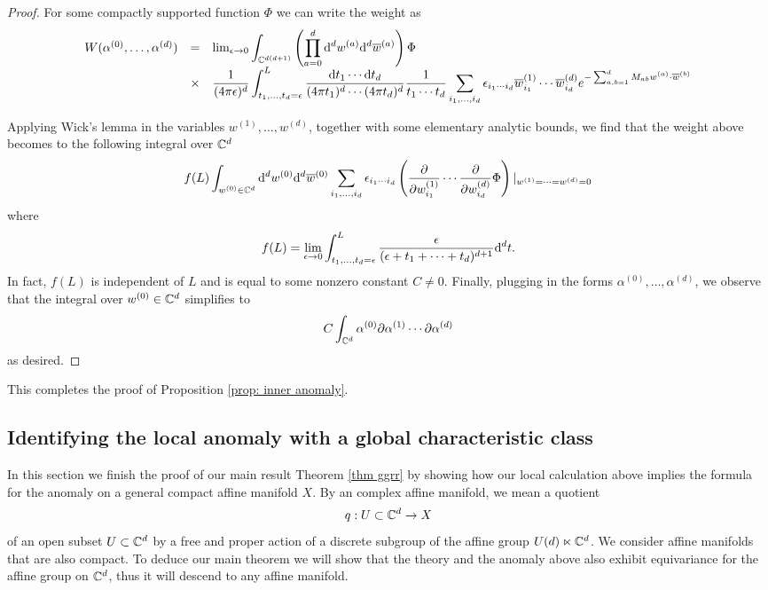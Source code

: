 \documentclass[10pt]{amsart}
\begin{document}
\begin{proof}
For some compactly supported function $\Phi$ we can write the weight as
\[
\begin{array}{ccl}
W (\alpha^{(0)}, \ldots, \alpha^{(d)}) & = & \lim_{\epsilon \to 0} \displaystyle \int_{\mathbb C^{d(d+1)}} \left(\prod_{a = 0}^{d} {\rm d}^d w^{(a)} {\rm d}^d \overline{w}^{(a)}\right) \Phi \\ & \times & \displaystyle \frac{1}{(4 \pi \epsilon)^d} \int_{t_1,\ldots,t_d = \epsilon}^L \frac{{\rm d} t_1 \cdots {\rm d} t_d}{(4 \pi t_1)^d \cdots (4 \pi t_d)^d} \frac{1}{t_1\cdots t_d} \sum_{i_1,\ldots, i_d} \epsilon_{i_1\cdots i_d} \overline{w}_{i_1}^{(1)} \cdots \overline{w}_{i_d}^{(d)} e^{-\sum_{a,b = 1}^d M_{a b} w^{(a)} \cdot \overline{w}^{(b)}} 
\end{array}
\]

Applying Wick's lemma in the variables $w^{(1)}, \ldots, w^{(d)}$, together with some elementary analytic bounds, we find that the weight above becomes to the following integral over $\mathbb C^d$
\[
f(L) \int_{w^{(0)} \in \mathbb C^d}  {\rm d}^d w^{(0)} {\rm d}^d \overline{w}^{(0)} \sum_{i_1,\ldots, i_d} \epsilon_{i_1\cdots i_d}  
\left(\frac{\partial}{\partial w_{i_1}^{(1)}} \cdots \frac{\partial}{\partial w_{i_d}^{(d)}} \Phi\right)|_{w^{(1)}=\cdots=w^{(d)} = 0} 
\]
where
\[
f(L) = \lim_{\epsilon \to 0} \int_{t_1,\ldots,t_d = \epsilon}^L \frac{\epsilon}{(\epsilon + t_1 + \cdots + t_d)^{d+1}} {\rm d}^d t .
\]
In fact, $f(L)$ is independent of $L$ and is equal to some nonzero constant $C \ne 0$.
Finally, plugging in the forms $\alpha^{(0)}, \ldots, \alpha^{(d)}$, we observe that the integral over $w^{(0)} \in \mathbb C^d$ simplifies to
\[
C \int_{\mathbb C^d} \alpha^{(0)} \partial \alpha^{(1)} \cdots\partial \alpha^{(d)}
\]
as desired.
\end{proof}

This completes the proof of Proposition \ref{prop: inner anomaly}.

\subsection{Identifying the local anomaly with a global characteristic class}

In this section we finish the proof of our main result Theorem \ref{thm ggrr} by showing how our local calculation above implies the formula for the anomaly on a general compact affine manifold $X$.
By an complex affine manifold, we mean a quotient 
\[
q : U \subset \mathbb C^d \to X
\]
of an open subset $U \subset \mathbb C^d$ by a free and proper action of a discrete subgroup of the affine group $U(d) \ltimes \mathbb C^d$. 
We consider affine manifolds that are also compact. 
To deduce our main theorem we will show that the theory and the anomaly above also exhibit equivariance for the affine group on $\mathbb C^d$, thus it will descend to any affine manifold.
\end{document}
